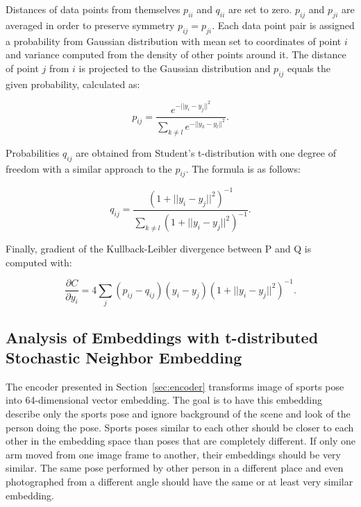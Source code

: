 Distances of data points from themselves $p_{i i}$ and $q_{i i}$ are set to zero. $p_{i j}$ and $p_{j i}$ are averaged in order to preserve symmetry $p_{i j} = p_{j i}$. Each data point pair is assigned a probability from Gaussian distribution with mean set to coordinates of point $i$ and variance computed from the density of other points around it. The distance of point $j$ from $i$ is projected to the Gaussian distribution and $p_{i j}$ equals the given probability, calculated as:

\begin{equation}
    \label{eq:tsne-p}
    p_{i j} = \frac{e^{-|| {y}_{i} - {y}_{j} ||^2}}{\sum \limits_{k \neq l} e^{-|| {y}_{k} - {y}_{l} ||^2}}.
\end{equation}

\noindent Probabilities $q_{i j}$ are obtained from Student's t-distribution with one degree of freedom with a similar approach to the $p_{i j}$. The formula is as follows:

\begin{equation}
    \label{eq:tsne-q}
    q_{i j} = \frac{(1 + || {y}_{i} - {y}_{j} ||^2)^{-1}}{\sum \limits_{k \neq l} (1 + || {y}_{i} - {y}_{j} ||^2)^{-1}}.
\end{equation}

\noindent Finally, gradient of the Kullback-Leibler divergence between P and Q is computed with:

\begin{equation}
    \label{eq:tsne-gradient}
    \frac{\partial C}{\partial y_{i}} = 4 \sum \limits_{j} (p_{i j} - q_{i j}) (y_{i} - y_{j}) (1 + || {y}_{i} - {y}_{j} ||^2)^{-1}.
\end{equation}

\subsection{Analysis of Embeddings with t-distributed Stochastic Neighbor Embedding}

The encoder presented in Section~\ref{sec:encoder} transforms image of sports pose into 64-dimensional vector embedding. The goal is to have this embedding describe only the sports pose and ignore background of the scene and look of the person doing the pose. Sports poses similar to each other should be closer to each other in the embedding space than poses that are completely different. If only one arm moved from one image frame to another, their embeddings should be very similar. The same pose performed by other person in a different place and even photographed from a different angle should have the same or at least very similar embedding.

